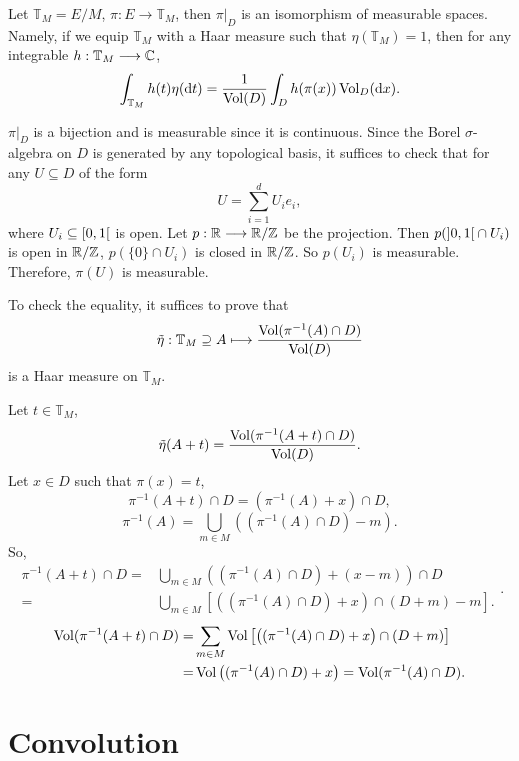 \begin{propositionenv}
    Let $\mathbb{T}_M = E/M$, $\pi : E \longrightarrow \mathbb{T}_M$, then $\pi|_D$ is an isomorphism of measurable spaces.
    Namely, if we equip $\mathbb{T}_M$ with a Haar measure such that $\eta(\mathbb{T}_M) = 1$, then for any integrable $h : \mathbb{T}_M \longrightarrow \mathbb{C}$,
    $$\int_{\mathbb{T}_M} h(t) \eta(\mathrm{d} t) = \frac{1}{\operatorname{\mathrm{Vol}}(D)} \int_{D} h(\pi(x)) \operatorname{\mathrm{Vol}}_{D}(\mathrm{d} x).$$
\end{propositionenv}
\begin{proofenv}
    $\pi|_{D}$ is a bijection and is measurable since it is continuous.
    Since the Borel $\sigma$-algebra on $D$ is generated by any topological basis, it suffices to check that for any $U \subseteq D$ of the form
    $$U = \sum_{i=1}^{d} U_i e_i,$$
    where $U_i \subseteq \interval[open right]{0}{1}$ is open.
    Let $p : \mathbb{R} \longrightarrow \mathbb{R}/\mathbb{Z}$ be the projection.
    Then $p(\interval[open]{0}{1} \cap U_i)$ is open in $\mathbb{R}/\mathbb{Z}$,
    $p(\{0\} \cap U_i)$ is closed in $\mathbb{R}/\mathbb{Z}$.
    So $p(U_i)$ is measurable.
    Therefore, $\pi(U)$ is measurable.

    \quad To check the equality, it suffices to prove that
    $$\tilde{\eta} : \mathbb{T}_M \supseteq A \longmapsto \frac{\operatorname{\mathrm{Vol}}(\pi^{-1}(A) \cap D)}{\operatorname{\mathrm{Vol}}(D)}$$
    is a Haar measure on $\mathbb{T}_M$.

    \quad Let $t \in \mathbb{T}_M$,
    $$\tilde{\eta}(A + t) = \frac{\operatorname{\mathrm{Vol}}(\pi^{-1}(A + t) \cap D)}{\operatorname{\mathrm{Vol}}(D)}.$$
    Let $x \in D$ such that $\pi(x) = t$,
    $$\pi^{-1}(A + t) \cap D= (\pi^{-1}(A) + x) \cap D,$$
    $$\pi^{-1}(A) = \bigcup_{m \in M} \left((\pi^{-1}(A) \cap D) - m\right).$$
    So,
    $$\begin{aligned}
        \pi^{-1}(A + t) \cap D = & \bigcup_{m \in M} \left((\pi^{-1}(A) \cap D) + (x - m)\right) \cap D\\
        = & \bigcup_{m \in M} \left[\left((\pi^{-1}(A) \cap D) + x\right) \cap (D + m) - m\right].
    \end{aligned}.$$
    $$\begin{aligned}
        \operatorname{\mathrm{Vol}}(\pi^{-1}(A + t) \cap D) = & \sum_{m \in M} \operatorname{\mathrm{Vol}}\left[\left((\pi^{-1}(A) \cap D) + x\right) \cap (D + m)\right]\\
        = & \operatorname{\mathrm{Vol}}\left((\pi^{-1}(A) \cap D) + x\right) = \operatorname{\mathrm{Vol}}(\pi^{-1}(A) \cap D).
    \end{aligned}$$
\end{proofenv}


\section{Convolution}

